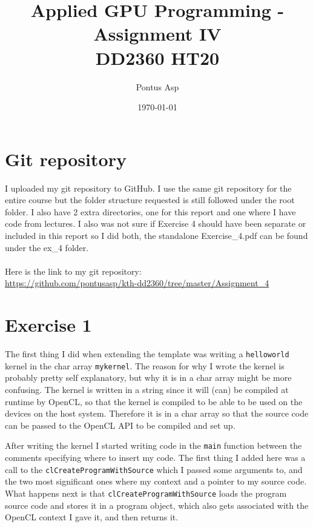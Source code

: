 \documentclass[a4paper, 12pt]{article}
\def\code#1{\texttt{#1}}
\begin{document}
\title{\vspace{4.0cm}Applied GPU Programming - Assignment IV\\
\large DD2360 HT20}
\author{Pontus Asp}
\date{\today}
\maketitle
\thispagestyle{empty}
\newpage

\clearpage
{}

\section{Git repository}
I uploaded my git repository to GitHub. I use the same git repository for the entire course but the folder structure requested is still followed under the root folder. I also have 2 extra directories, one for this report and one where I have code from lectures. I also was not sure if Exercise 4 should have been separate or included in this report so I did both, the standalone Exercise\_4.pdf can be found under the ex\_4 folder.
\\\\
Here is the link to my git repository:\\
\url{https://github.com/pontusasp/kth-dd2360/tree/master/Assignment_4}

\section{Exercise 1}
The first thing I did when extending the template was writing a \code{helloworld} kernel in the char array \code{mykernel}. The reason for why I wrote the kernel is probably pretty self explanatory, but why it is in a char array might be more confusing. The kernel is written in a string since it will (can) be compiled at runtime by OpenCL, so that the kernel is compiled to be able to be used on the devices on the host system. Therefore it is in a char array so that the source code can be passed to the OpenCL API to be compiled and set up.

After writing the kernel I started writing code in the \code{main} function between the comments specifying where to insert my code. The first thing I added here was a call to the \code{clCreateProgramWithSource} which I passed some arguments to, and the two most significant ones where my context and a pointer to my source code. What happens next is that \code{clCreateProgramWithSource} loads the program source code and stores it in a program object, which also gets associated with the OpenCL context I gave it, and then returns it.
\end{document}

